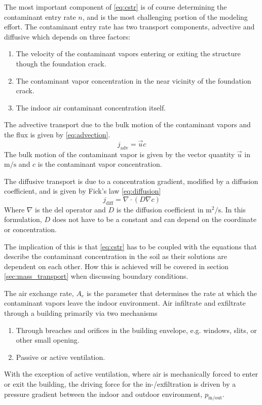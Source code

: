 The most important component of \eqref{eq:cstr} is of course determining the contaminant entry rate $n$, and is the most challenging portion of the modeling effort.
The contaminant entry rate has two transport components, advective and diffusive which depends on three factors:
\begin{enumerate}
  \item The velocity of the contaminant vapors entering or exiting the structure though the foundation crack.
  \item The contaminant vapor concentration in the near vicinity of the foundation crack.
  \item The indoor air contaminant concentration itself.
\end{enumerate}
The advective transport due to the bulk motion of the contaminant vapors and the flux is given by \eqref{eq:advection}.
\begin{equation}\label{eq:advection} %
  j_\mathrm{adv} = \vec{u} c
\end{equation}
The bulk motion of the contaminant vapor is given by the vector quantity $\vec{u}$ in $\mathrm{m/s}$ and $c$ is the contaminant vapor concentration.\par

The diffusive transport is due to a concentration gradient, modified by a diffusion coefficient, and is given by Fick's law \eqref{eq:diffusion}
\begin{equation}\label{eq:diffusion}
  j_\mathrm{diff} = \nabla \cdot (D\nabla c)
\end{equation}
Where $\nabla$ is the del operator and $D$ is the diffusion coefficient in $\mathrm{m^2/s}$.
In this formulation, $D$ does not have to be a constant and can depend on the coordinate or concentration.\par

The implication of this is that \eqref{eq:cstr} has to be coupled with the equations that describe the contaminant concentration in the soil as their solutions are dependent on each other.
How this is achieved will be covered in section \ref{sec:mass_transport} when discussing boundary conditions.\par

The air exchange rate, $A_e$ is the parameter that determines the rate at which the contaminant vapors leave the indoor environment.
Air infiltrate and exfiltrate through a building primarily via two mechanisms
\begin{enumerate}
  \item Through breaches and orifices in the building envelope, e.g. windows, slits, or other small opening.
  \item Passive or active ventilation.
\end{enumerate}
With the exception of active ventilation, where air is mechanically forced to enter or exit the building, the driving force for the in-/exfiltration is driven by a pressure gradient between the indoor and outdoor environment, $p_\mathrm{in/out}$.\par

